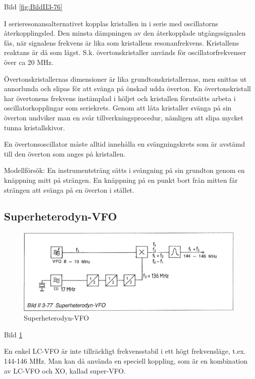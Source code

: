 Bild \ref{fig:BildII3-76}

I serieresonansalternativet kopplas kristallen in i serie med
oscillatorns återkopplingsled. Den minsta dämpningen av den
återkopplade utgångssignalen fås, när signalens frekvens är lika som
kristallens resonanfrekvens. Kristallens reaktans är då som
lägst. S.k. övertonskristaller används för oscillatorfrekvenser över
ca 20 MHz.

Övertonskristallernas dimensioner är lika grundtonskristallernas, men
snittas ut annorlunda och slipas för att svänga på önskad udda
överton. En övertonskristall har övertonens frekvens instämplad i
höljet och kristallen förutsätts arbeta i oscillatorkopplingar som
seriekrets. Genom att låta kristaller svänga på sin överton undviker
man en svår tillverkningsprocedur, nämligen att slipa mycket tunna
kristallskivor.

En övertonsoscillator måste alltid innehålla en svängningskrets som är
avstämd till den överton som anges på kristallen.

Modellförsök: En instrumentsträng sätts i svängning på sin grundton
genom en knäppning mitt på strängen. En knäppning på en punkt bort
från mitten får strängen att svänga på en överton i stället.

\subsection{Superheterodyn-VFO}

\begin{figure}
\includegraphics[width=\textwidth]{images/bild_2_3-77}
\caption{Superheterodyn-VFO}
\label{fig:BildII3-77}
\end{figure}

Bild \ref{fig:BildII3-77}

En enkel LC-VFO är inte tillräckligt frekvensstabil i ett högt
frekvensläge, t.ex. 144-146 MHz. Man kan då använda en speciell
koppling, som är en kombination av LC-VFO och XO, kallad super-VFO.

